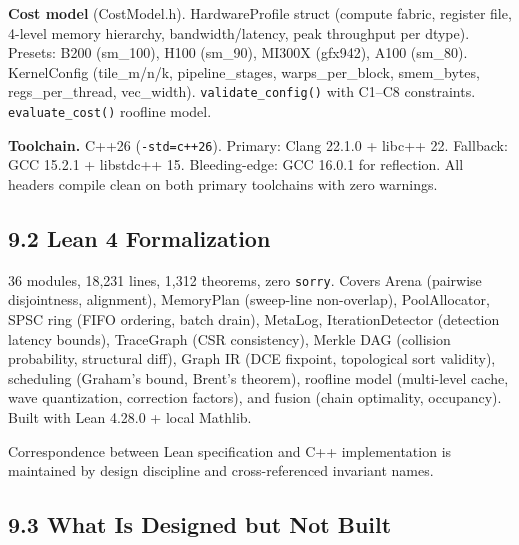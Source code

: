 \textbf{Cost model} (CostModel.h). HardwareProfile struct (compute fabric, register file, 4-level memory hierarchy, bandwidth/latency, peak throughput per dtype). Presets: B200 (sm\_100), H100 (sm\_90), MI300X (gfx942), A100 (sm\_80). KernelConfig (tile\_m/n/k, pipeline\_stages, warps\_per\_block, smem\_bytes, regs\_per\_thread, vec\_width). \texttt{validate\_config()} with C1--C8 constraints. \texttt{evaluate\_cost()} roofline model.

\textbf{Toolchain.} C++26 (\texttt{-std=c++26}). Primary: Clang 22.1.0 + libc++ 22. Fallback: GCC 15.2.1 + libstdc++ 15. Bleeding-edge: GCC 16.0.1 for reflection. All headers compile clean on both primary toolchains with zero warnings.

\subsection{9.2 Lean 4 Formalization}\label{lean-4-formalization-1}

36 modules, 18,231 lines, 1,312 theorems, zero \texttt{sorry}. Covers Arena (pairwise disjointness, alignment), MemoryPlan (sweep-line non-overlap), PoolAllocator, SPSC ring (FIFO ordering, batch drain), MetaLog, IterationDetector (detection latency bounds), TraceGraph (CSR consistency), Merkle DAG (collision probability, structural diff), Graph IR (DCE fixpoint, topological sort validity), scheduling (Graham's bound, Brent's theorem), roofline model (multi-level cache, wave quantization, correction factors), and fusion (chain optimality, occupancy). Built with Lean 4.28.0 + local Mathlib.

Correspondence between Lean specification and C++ implementation is maintained by design discipline and cross-referenced invariant names.

\subsection{9.3 What Is Designed but Not Built}\label{what-is-designed-but-not-built}

